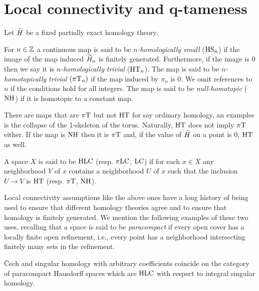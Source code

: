 
\section{Local connectivity and q-tameness} \label{s:connectivity}

Let $\widetilde{H}$ be a fixed partially exact homology theory.

\begin{defi} \label{defi:local_connectedness}
	For $n \in \mathbb{Z}$ a continuous map is said to be \textit{$n$-homologically small} ($\mathrm{HS}_n$) if the image of the map induced $\widetilde{H}_{n}$ is finitely generated.
	Furthermore, if the image is $0$ then we say it is \textit{$n$-homologically trivial} ($\mathrm{HT}_n$).
	The map is said to be \textit{$n$-homotopically trivial} $(\pi\mathrm{T}_{n})$ if the map induced by $\pi_{n}$ is 0.
	We omit references to $n$ if the conditions hold for all integers.
	The map is said to be \emph{null-homotopic} ($\mathrm{NH}$) if it is homotopic to a constant map.
\end{defi}

There are maps that are $\pi\mathrm{T}$ but not $\mathrm{HT}$ for say ordinary homology, an examples is the collapse of the 1-skeleton of the torus.
Naturally, $\mathrm{HT}$ does not imply $\pi\mathrm{T}$ either.
If the map is $\mathrm{NH}$ then it is $\pi\mathrm{T}$ and, if the value of $\widetilde{H}$ on a point is 0, $\mathrm{HT}$ as well.

\begin{defi}
	A space $X$ is said to be $\mathrm{HLC}$ (resp. $\pi\mathrm{LC}$, $\mathrm{LC}$) if for each $x \in X$ any neighborhood $V$ of $x$ contains a neighborhood $U$ of $x$ such that the inclusion $U \to V$ is $\mathrm{HT}$ (resp. $\pi\mathrm{T}$, $\mathrm{NH}$).
\end{defi}

Local connectivity assumptions like the above ones have a long history of being used to ensure that different homology theories agree and to ensure that homology is finitely generated.
We mention the following examples of these two uses, recalling that a space is said to be \textit{paracompact} if every open cover has a locally finite open refinement, i.e., every point has a neighborhood intersecting finitely many sets in the refinement.

\begin{prop}[\citet{MR105677}] \label{prop:cech_sing_hom_hlc}
	\v{C}ech and singular homology with arbitrary coefficients coincide on the category of paracompact Hausdorff spaces which are $\mathrm{HLC}$ with respect to integral singular homology.
\end{prop}

